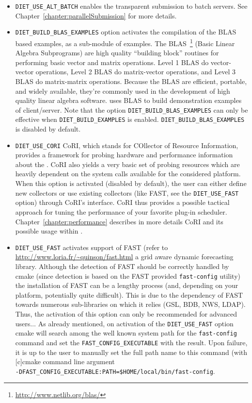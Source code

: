 \begin{itemize}
\item
  \verb+DIET_USE_ALT_BATCH+ enables the transparent submission to
  batch servers. See Chapter~\ref{chapter:parallelSubmission} for more
  details.

\item
  \verb+DIET_BUILD_BLAS_EXAMPLES+ option activates the compilation of
  the BLAS based \diet examples, as a sub-module of examples.  The
  BLAS~\footnote{\url{http://www.netlib.org/blas/}} (Basic Linear
  Algebra Subprograms) are high quality ``building block'' routines
  for performing basic vector and matrix operations.  Level 1 BLAS do
  vector-vector operations, Level 2 BLAS do matrix-vector operations,
  and Level 3 BLAS do matrix-matrix operations.  Because the BLAS are
  efficient, portable, and widely available, they're commonly used in
  the development of high quality linear algebra software. \diet uses
  BLAS to build demonstration examples of client/server.  Note that
  the option \verb+DIET_BUILD_BLAS_EXAMPLES+ can only be effective
  when \verb+DIET_BUILD_EXAMPLES+ is enabled.
  \verb+DIET_BUILD_BLAS_EXAMPLES+ is disabled by default.

\item
  \verb+DIET_USE_CORI+ CoRI, which stands for COllector of Resource
  Information, provides a framework for probing hardware and
  performance information about the \sed. CoRI also yields a very
  basic set of probing resources which are heavily dependent on the
  system calls available for the considered platform.  When this
  option is activated (disabled by default), the user can either
  define new collectors or use existing collectors (like FAST, see the
  \verb+DIET_USE_FAST+ option) through CoRI's interface. CoRI thus
  provides a possible tactical approach for tuning the performance of
  your favorite plug-in scheduler.  Chapter~\ref{chapter:performance}
  describes in more details CoRI and its possible usage within \diet.

\item
  \verb+DIET_USE_FAST+ activates \diet support of FAST (refer to
  \url{http://www.loria.fr/~quinson/fast.html} a grid aware dynamic
  forecasting library. Although the detection of FAST should be
  correctly handled by cmake (since detection is based on the FAST
  provided \verb+fast-config+ utility) the installation of FAST can be
  a lengthy process (and, depending on your platform, potentially
  quite difficult). This is due to the dependency of FAST towards
  numerous sub-libraries on which it relies (GSL, BDB, NWS, LDAP).
  Thus, the activation of this option can only be recommended for
  advanced users$\ldots$ As already mentioned, on activation of the
  \verb+DIET_USE_FAST+ option cmake will search among the well known
  system path for the \verb+fast-config+ command and set the
  \verb+FAST_CONFIG_EXECUTABLE+ with the result. Upon failure, it is
  up to the user to manually set the full path name to this command
  (\eg with [c]cmake command line argument\\ 
  \verb+-DFAST_CONFIG_EXECUTABLE:PATH=$HOME/local/bin/fast-config+.


\end{itemize}

